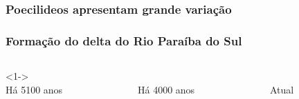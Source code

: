 \documentclass{beamer}
\begin{document}
\begin{frame}
  \frametitle{ Poecilideos  apresentam  grande variação}
\centering


  \centering
  



\end{frame}




\begin{frame}
  \frametitle{Formação do delta do Rio Paraíba do Sul}

  \begin{columns}
    

    \begin{column}{4cm}
      \centering
      <1->\\
Há 5100 anos
    \end{column}
    \begin{column}{4cm}
     \pause
       \centering
      \\
     Há 4000 anos
    \end{column}

    \begin{column}{4cm}
\pause
      \centering
      \\
 Atual
    \end{column}
  \end{columns}  


\end{frame}
\end{document}
